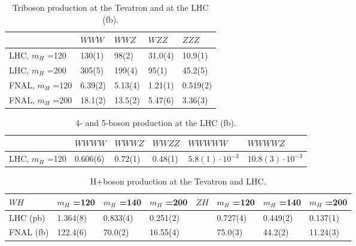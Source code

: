 \documentclass[paper]{JHEP3}
\newcommand{\ccaption}[2]{
    \begin{center}
    \parbox{0.85\textwidth}{
      \caption[#1]{\small{{#2}}}
      }
    \end{center}
    }
\def    \mH             {\mbox{$m_H$} }
\def\ppbar{\mbox{$p \bar{p}$}}
\begin{document}
{\renewcommand{\arraystretch}{1.2}
\begin{table}
\begin{center}
\begin{tabular}{||l|l|l|l|l||}\hline
        & $WWW$ & $WWZ$ & $WZZ$ & $ZZZ$ 
   \\  \hline
LHC, \mH=120  & 130(1)&98(2)&31.0(4) &10.9(1)
   \\  \hline 	       	      
LHC, \mH=200  & 305(5)&199(4)&95(1) & 45.2(5)
   \\  \hline	       	      
FNAL, \mH=120 & 6.39(2)&5.13(4)&1.21(1) &0.519(2)
   \\  \hline	       	      
FNAL, \mH=200 & 18.1(2)&13.5(2)&5.47(6) &3.36(3)
  \\  \hline
\end{tabular}            
\ccaption{}{\label{tab:wwwxs} Triboson production at the 
Tevatron and 
at the LHC (fb).}
\end{center}
\end{table}}

{\renewcommand{\arraystretch}{1.2}
\begin{table}
\begin{center}
\begin{tabular}{||l|l|l|l|l|l||}\hline
        & $WWWW$ & $WWWZ$ & $WWZZ$ & $WWWWW$ & $WWWWZ$ 
                 \\  \hline
LHC, \mH=120 & 0.606(6) & 0.72(1) & 0.48(1) & $5.8(1)\cdot 10^{-3}$
                                            & $10.8(3)\cdot 10^{-3}$
                 \\  \hline
\end{tabular}            
\ccaption{}{\label{tab:4wxs} 4- and 5-boson production at the 
LHC (fb). }
\end{center}
\end{table}}


{\renewcommand{\arraystretch}{1.2}
\begin{table}
\begin{center}
\begin{tabular}{||l|l|l|l||l|l|l|l||}\hline
$WH$ & \mH=120 & \mH=140 & \mH=200 &
$ZH$ & \mH=120 & \mH=140 & \mH=200 
\\ \hline
LHC (pb)   & 1.364(8) & 0.833(4) & 0.251(2) & & 0.727(4) & 0.449(2) & 0.137(1)
\\ \hline
FNAL (fb)  & 122.4(6)& 70.0(2) & 16.55(4) & & 75.0(3) & 44.2(2) & 11.24(3)
\\ \hline
\end{tabular}            
\ccaption{}{\label{tab:whxs} H+boson production 
at the Tevatron and LHC.}
\end{center}
\end{table}}
\end{document}
